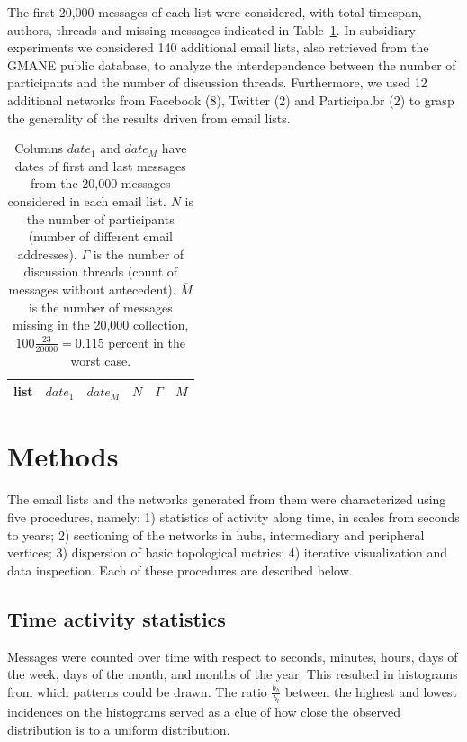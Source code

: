 \documentclass[%
	aip,
	jmp,%
	amsmath,amssymb,
	reprint,%
]{revtex4-1}
\begin{document}
The first 20,000 messages of each list were considered, with total timespan, authors, threads and missing messages indicated in Table~\ref{tab:genLists}.
In subsidiary experiments we considered 140 additional email lists, also retrieved from the GMANE public database, to analyze the interdependence between the number of participants and the number of discussion threads. Furthermore, we used 12 additional networks from Facebook (8), Twitter (2) and Participa.br (2) to grasp the generality of the results driven from email lists.

\begin{table}
	\centering
	\caption{Columns $date_1$ and $date_M$ have dates of first and last messages from the 20,000 messages considered in each email list.
		$N$ is the number of participants (number of different email addresses).
		$\Gamma$ is the number of discussion threads (count of messages without antecedent).
		$\overline{M}$ is the number of messages missing in the 20,000 collection, $100\frac{23}{20000}=0.115$ percent in the worst case.
	}
	\label{tab:genLists}
	\begin{tabular}{|l|c|c|c|c|c|}\hline
		list & $date_1$ & $date_{M}$    & $N$  & $\Gamma$ & $\overline{M}$ \\\hline
		
	\end{tabular}
\end{table}


\section{Methods}\label{sec:carac}
The email lists and the networks generated from them were characterized using five procedures, namely: 1) statistics of activity along time, in scales from seconds to years; 2) sectioning of the networks in hubs, intermediary and peripheral vertices; 3) dispersion of basic topological metrics; 4) iterative visualization and data inspection.
Each of these procedures are described below.

\subsection{Time activity statistics}\label{sec:mtime}
Messages were counted over time with respect to seconds, minutes, hours, days of the week, days of the month, and months of the year. This resulted in histograms from which patterns could be drawn. The ratio $\frac{b_h}{b_l}$ between the highest and lowest incidences on the histograms served as a clue of how close the observed distribution is to a uniform distribution.
\end{document}
